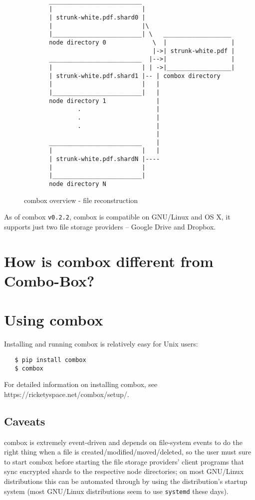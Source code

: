 \begin{figure}[h]
\begin{verbatim}

       __________________________
       |                         |
       | strunk-white.pdf.shard0 |
       |                         |\
       |_________________________| \   ___________________
       node directory 0             \  |                  |
                                    |->| strunk-white.pdf |
       __________________________  |-->|                  |
       |                         | | ->|__________________|
       | strunk-white.pdf.shard1 |-- | combox directory
       |                         |   |
       |_________________________|   |
       node directory 1              |
               .                     |
               .                     |
               .                     |
                                     |
       __________________________    |
       |                         |   |
       | strunk-white.pdf.shardN |----
       |                         |
       |_________________________|
       node directory N

\end{verbatim}
\caption{combox overview - file reconstruction}
\label{fig:1-combox-overview-1}
\end{figure}

As of combox \verb+v0.2.2+, combox is compatible on GNU/Linux and OS
X, it supports just two file storage providers -- Google Drive and
Dropbox.

\section{How is combox different from Combo-Box?}\label{1-sec-cb-diff}

\section{Using combox}\label{1-sec-using-cb}

Installing and running combox is relatively easy for Unix users:

\begin{verbatim}
   $ pip install combox
   $ combox
\end{verbatim}

For detailed information on installing combox, see
https://ricketyspace.net/combox/setup/.

\subsection{Caveats}

combox is extremely event-driven and depends on file-system events to
do the right thing when a file is created/modified/moved/deleted, so
the user must sure to start combox before starting the file storage
providers' client programs that sync encrypted shards to the
respective node directories; on most GNU/Linux distributions this can
be automated through by using the distribution's startup system (most
GNU/Linux distributions seem to use
\verb+systemd+\cite{website:systemd} these days).
